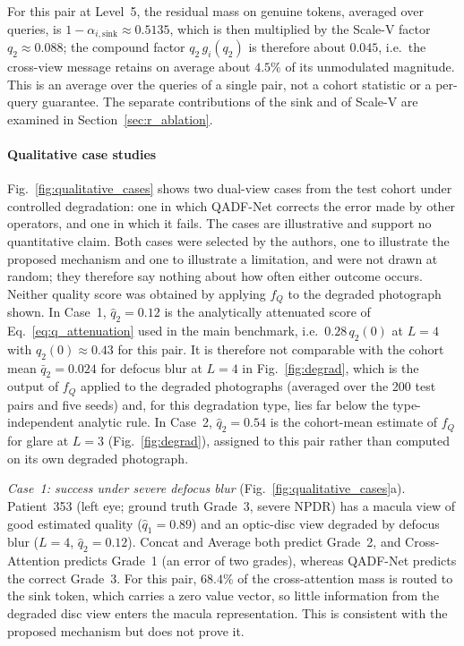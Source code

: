 \documentclass[final,5p,times,twocolumn,authoryear]{elsarticle}
\newcommand{\qadfnet}{QADF-Net}
\theoremstyle{plain}
\theoremstyle{remark}
\begin{document}
For this pair at Level~5, the residual mass on genuine tokens, averaged over queries, is $1-\alpha_{i,\text{sink}} \approx 0.5135$, which is then multiplied by the Scale-V factor $q_2 \approx 0.088$; the compound factor $q_2\, g_i(q_2)$ is therefore about $0.045$, i.e.\ the cross-view message retains on average about $4.5\%$ of its unmodulated magnitude. This is an average over the queries of a single pair, not a cohort statistic or a per-query guarantee. The separate contributions of the sink and of Scale-V are examined in Section~\ref{sec:r_ablation}.

\paragraph{Qualitative case studies}
Fig.~\ref{fig:qualitative_cases} shows two dual-view cases from the test cohort under controlled degradation: one in which \qadfnet{} corrects the error made by other operators, and one in which it fails. The cases are illustrative and support no quantitative claim.
Both cases were selected by the authors, one to illustrate the proposed mechanism and one to illustrate a limitation, and were not drawn at random; they therefore say nothing about how often either outcome occurs. Neither quality score was obtained by applying $f_Q$ to the degraded photograph shown. In Case~1, $\hat{q}_2 = 0.12$ is the analytically attenuated score of Eq.~\eqref{eq:q_attenuation} used in the main benchmark, i.e.\ $0.28\,q_2(0)$ at $L=4$ with $q_2(0) \approx 0.43$ for this pair. It is therefore not comparable with the cohort mean $\bar{q}_2 = 0.024$ for defocus blur at $L=4$ in Fig.~\ref{fig:degrad}, which is the output of $f_Q$ applied to the degraded photographs (averaged over the 200 test pairs and five seeds) and, for this degradation type, lies far below the type-independent analytic rule. In Case~2, $\hat{q}_2 = 0.54$ is the cohort-mean estimate of $f_Q$ for glare at $L=3$ (Fig.~\ref{fig:degrad}), assigned to this pair rather than computed on its own degraded photograph.

\emph{Case~1: success under severe defocus blur} (Fig.~\ref{fig:qualitative_cases}a). Patient~353 (left eye; ground truth Grade~3, severe NPDR) has a macula view of good estimated quality ($\hat{q}_1 = 0.89$) and an optic-disc view degraded by defocus blur ($L=4$, $\hat{q}_2 = 0.12$). Concat and Average both predict Grade~2, and Cross-Attention predicts Grade~1 (an error of two grades), whereas \qadfnet{} predicts the correct Grade~3. For this pair, $68.4\%$ of the cross-attention mass is routed to the sink token, which carries a zero value vector, so little information from the degraded disc view enters the macula representation. This is consistent with the proposed mechanism but does not prove it.
\end{document}
